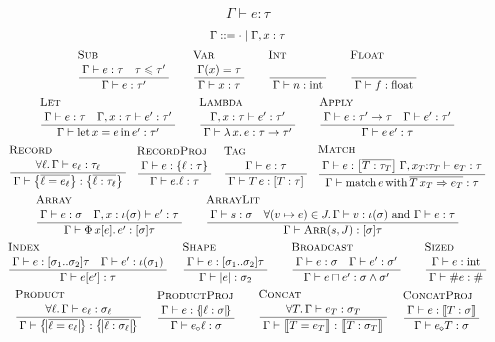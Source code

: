 \renewcommand\arraystretch{1.3}
$$\boxed{\Gamma \vdash e : \tau}$$
\vspace{-1em}
\small
$$ \begin{array}{c}
\Gamma ::= \cdot \mid \Gamma, x : \tau \\
\irule{Sub}{\Gamma \vdash e : \tau \quad \tau \sub \tau'}{\Gamma \vdash e : \tau'} \quad
\irule{Var}{\Gamma(x) = \tau}{\Gamma \vdash x : \tau} \quad
\irule{Int}{}{\Gamma \vdash n:\mathrm{int}} \quad
\irule{Float}{}{\Gamma \vdash f:\mathrm{float}} \\
\irule{Let}
     {\Gamma \vdash e:\tau \quad \Gamma,x:\tau \vdash e':\tau'}
     {\Gamma \vdash \slet{x}{e}{e'} : \tau'} \quad
\irule{Lambda}{\Gamma,x:\tau \vdash e':\tau'}{\Gamma \vdash \slam{x}{e}: \tau\sfntype\tau'} \quad
\irule{Apply}{\Gamma \vdash e:\tau'\sfntype\tau \quad \Gamma \vdash e':\tau'}{\Gamma \vdash e \, e' : \tau} \\
\irule{Record}
     {\forall \ell \ldotp \Gamma \vdash e_\ell:\tau_\ell}
     {\Gamma \vdash \srecordval{ \overline{\ell = e_\ell} } : \srecordtype{ \overline{ \ell : \tau_\ell } }} \!
\irule{RecordProj}{\Gamma \vdash e : \srecordtype{\ell : \tau} }{\Gamma \vdash \sproj{e}{\ell} : \tau} 
\irule{Tag}{\Gamma \vdash e : \tau}{\Gamma \vdash \stag{T}{e} : \svarianttype{T : \tau }} \!
\irule{Match}{\Gamma \vdash e : \svarianttype{\overline{T : \tau_T}} \; \Gamma, x_T {:} \tau_T \vdash e_T : \tau}{\Gamma \vdash \smatch{e}{\overline{\stag{T}{x_T} \Rightarrow e_T}} : \tau} \\
\irule{Array}
     {\Gamma \vdash e:\sigma \quad \Gamma,x:\iota(\sigma) \vdash e':\tau}
     {\Gamma \vdash \sbuild{x}{e}{e'} : \suniarraytype{\sigma}\tau} \quad
 \irule{ArrayLit}{\Gamma \vdash \vess : \sigma \quad \forall (v \mapsto e) \in J \ldotp \Gamma \vdash v : \iota(\sigma) \text{ and } \Gamma \vdash e : \tau}{\Gamma \vdash \sarrayval{\vess}{J} : \suniarraytype{\sigma}{\tau}} \\
\irule{Index}
     {\Gamma \vdash e:\sarraytype{\sigma_1}{\sigma_2}{\tau} \quad \Gamma \vdash e':\iota \left( \sigma_1 \right)}
     {\Gamma \vdash e[e'] : \tau} \;
\irule{Shape}{\Gamma \vdash e:\sarraytype{\sigma_1}{\sigma_2}{\tau}}{\Gamma \vdash \sshape{e}: \sigma_2} \quad
\irule{Broadcast}{\Gamma \vdash e : \sigma \quad \Gamma \vdash e' : \sigma'}{\Gamma \vdash \sbroadcast{e}{e'} : \sigma \meet \sigma'} \quad
\irule{Sized}{\Gamma \vdash e:\sint}{\Gamma \vdash \ssize{e} : \ssized} \\
\irule{Product}
     {\forall \ell \ldotp \Gamma \vdash e_\ell:\sigma_\ell}
     {\Gamma \vdash \sproductval{\overline{ \ell = e_\ell }} : \sproducttype{\overline{ \ell : \sigma_\ell }}} \;
\irule{ProductProj}{\Gamma \vdash e : \sproducttype{\ell : \sigma}}{\Gamma \vdash \sproductproj{e}{\ell} : \sigma} \quad
\irule{Concat}
     {\forall T \ldotp \Gamma \vdash e_T:\sigma_T}
     {\Gamma \vdash \sconcatval{\overline{ T = e_T }} : \sconcattype{\overline{ T : \sigma_T }}} \;
\irule{ConcatProj}{\Gamma \vdash e : \sconcattype{T : \sigma}}{\Gamma \vdash \sconcatproj{e}{T} : \sigma}
\end{array} $$